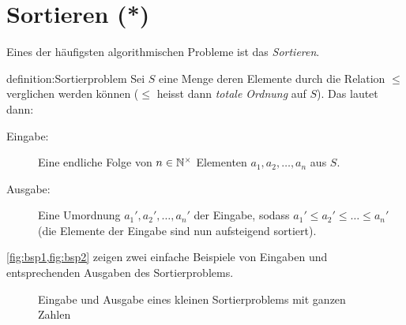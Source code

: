 \chapter{Sortieren (*)}\label{ch:Kapitel05}

Eines der häufigsten algorithmischen Probleme ist das \textit{Sortieren}.
\begin{definition}[Sortierproblem]{definition:Sortierproblem}
    Sei $S$ eine Menge deren Elemente durch die Relation $\leq$ verglichen werden können ($\leq$ heisst dann \textit{totale Ordnung} auf $S$). Das  lautet dann:
    \begin{description}
        \item[Eingabe:] Eine endliche Folge von $n\in\mathbb{N}^{\times}$ Elementen $a_1,a_2,\ldots,a_n$ aus $S$.
        \item[Ausgabe:] Eine Umordnung $a_1', a_2', \ldots, a_n'$ der Eingabe, sodass $a_1'\leq a_2' \leq \ldots \leq a_n'$ (die Elemente der Eingabe sind nun aufsteigend sortiert).
    \end{description}
\end{definition}
\cref{fig:bsp1,fig:bsp2} zeigen zwei einfache Beispiele von Eingaben und entsprechenden Ausgaben des Sortierproblems.

\begin{figure}[H]
    \def\lvld{1.2}                  %
    \pgfmathsetmacro\shft{-6*\lvld} %
    \centering
{}
    \caption{Eingabe und Ausgabe eines kleinen Sortierproblems mit ganzen Zahlen}
    \label{fig:bsp1}
\end{figure}

